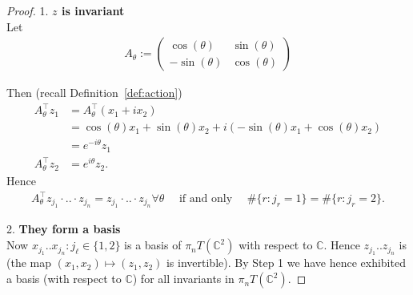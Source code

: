 \documentclass{scrartcl}
\theoremstyle{plain}
\theoremstyle{definition}
\newcommand{\C}{\mathbb{C}}
\newcommand{\1}[1]{1_{\{#1\}}}
\begin{document}
\begin{proof}
  1. \textbf{$z$ is invariant}\\
  Let
  \begin{align*}
    A_\theta :=
    \begin{pmatrix}
      \cos(\theta) & \sin(\theta) \\
      -\sin(\theta) & \cos(\theta)
    \end{pmatrix}
  \end{align*}

  Then (recall Definition~\ref{def:action})
  \begin{align*}
    A_\theta^\top z_1
    &=
    A_\theta^\top (x_1 + i x_2) \\
    &=
    \cos(\theta) x_1 + \sin(\theta) x_2
    +
    i \left( -\sin(\theta) x_1 + \cos(\theta) x_2 \right) \\
    &=
    e^{-i\theta} z_1 \\
    A_\theta^\top z_2 &= e^{i\theta} z_2.
  \end{align*}
  Hence
  \begin{align*}
    A_\theta^\top z_{j_1} \cdot .. \cdot z_{j_n} = z_{j_1} \cdot .. \cdot z_{j_n} \forall \theta
    \quad
    \text{ if and only }
    \quad
    \#\{ r : j_r = 1 \} = \#\{ r : j_r = 2 \}.
  \end{align*}

  2. \textbf{They form a basis}\\
  Now $x_{j_1} .. x_{j_n}: j_\ell \in \{1,2\}$ is a basis of $\pi_n T(\C^2)$ with respect to $\C$.
  Hence $z_{j_1} .. z_{j_n}$ is (the map $(x_1,x_2) \mapsto (z_1,z_2)$ is invertible).
  By Step 1 we have hence exhibited a basis (with respect to $\C$) for all invariants in $\pi_n T(\C^2)$.


\end{proof}
\end{document}
